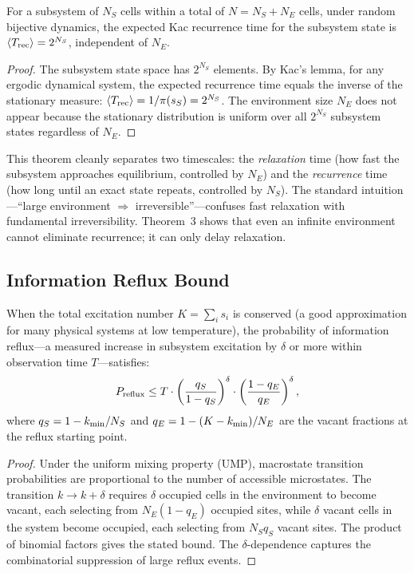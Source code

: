 \documentclass[reprint]{revtex4-2}
\begin{document}
\begin{theorem}
\label{thm:kac}
For a subsystem of $N_S$ cells within a total of $N=N_S+N_E$ cells, under random bijective dynamics, the expected Kac recurrence time for the subsystem state is $\langle T_{\rm rec}\rangle = 2^{N_S}$, independent of $N_E$.
\end{theorem}
\begin{proof}
The subsystem state space has $2^{N_S}$ elements. By Kac's lemma, for any ergodic dynamical system, the expected recurrence time equals the inverse of the stationary measure: $\langle T_{\rm rec}\rangle = 1/\pi(s_S) = 2^{N_S}$. The environment size $N_E$ does not appear because the stationary distribution is uniform over all $2^{N_S}$ subsystem states regardless of $N_E$.
\end{proof}

This theorem cleanly separates two timescales: the \emph{relaxation} time (how fast the subsystem approaches equilibrium, controlled by $N_E$) and the \emph{recurrence} time (how long until an exact state repeats, controlled by $N_S$). The standard intuition---``large environment $\Rightarrow$ irreversible''---confuses fast relaxation with fundamental irreversibility. Theorem~3 shows that even an infinite environment cannot eliminate recurrence; it can only delay relaxation.

\subsection{Information Reflux Bound}

\begin{theorem}
\label{thm:reflux}
When the total excitation number $K=\sum_i s_i$ is conserved (a good approximation for many physical systems at low temperature), the probability of information reflux---a measured increase in subsystem excitation by $\delta$ or more within observation time $T$---satisfies:
\begin{equation}
P_{\rm reflux} \le T \cdot \left(\frac{q_S}{1-q_S}\right)^\delta \cdot \left(\frac{1-q_E}{q_E}\right)^\delta,
\end{equation}
where $q_S=1-k_{\rm min}/N_S$ and $q_E=1-(K-k_{\rm min})/N_E$ are the vacant fractions at the reflux starting point.
\end{theorem}
\begin{proof}
Under the uniform mixing property (UMP), macrostate transition probabilities are proportional to the number of accessible microstates. The transition $k\to k+\delta$ requires $\delta$ occupied cells in the environment to become vacant, each selecting from $N_E(1-q_E)$ occupied sites, while $\delta$ vacant cells in the system become occupied, each selecting from $N_S q_S$ vacant sites. The product of binomial factors gives the stated bound. The $\delta$-dependence captures the combinatorial suppression of large reflux events.
\end{proof}
\end{document}
